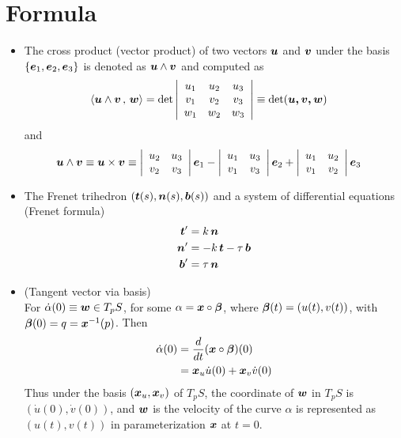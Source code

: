 \documentclass[11pt]{article}
\begin{document}
\section{Formula}
\begin{itemize}
\item The cross product (vector product) of two vectors $\boldsymbol{u}$ and $\boldsymbol{v}$ under the basis $\left\{\boldsymbol{e}_{1}, \boldsymbol{e}_{2}, \boldsymbol{e}_{3}\right\}$ is denoted as $\boldsymbol{u}\wedge \boldsymbol{v}$ and computed as
\begin{align}
\left\langle \boldsymbol{u}\wedge \boldsymbol{v}\,,\, \boldsymbol{w} \right\rangle &= \det\left\lvert \begin{array}{ccc}
u_{1} & u_{2} & u_{3} \\ 
v_{1} & v_{2} & v_{3} \\ 
w_{1} & w_{2} & w_{3}
\end{array}  \right\rvert  \equiv \det(\boldsymbol{u, v, w})\label{eqn: cross_prod}
\end{align}
and
\begin{align}
\boldsymbol{u}\wedge \boldsymbol{v} \equiv \boldsymbol{u} \times \boldsymbol{v} &\equiv \left\lvert \begin{array}{cc}
u_{2} & u_{3} \\ 
v_{2} & v_{3}
\end{array}  \right\rvert\boldsymbol{e}_{1}
- 
\left\lvert \begin{array}{cc}
u_{1} & u_{3} \\ 
v_{1} & v_{3}
\end{array}  \right\rvert\boldsymbol{e}_{2}
+
\left\lvert \begin{array}{cc}
u_{1} & u_{2} \\ 
v_{1} & v_{2}
\end{array}  \right\rvert\boldsymbol{e}_{3}  \label{eqn: cross_prod2}
\end{align}

\item The Frenet trihedron $(\boldsymbol{t}(s), \boldsymbol{n}(s), \boldsymbol{b}(s))$ and a system of differential equations (Frenet formula)
\begin{align}
\boldsymbol{t}' &= k\,\boldsymbol{n}\nonumber\\
\boldsymbol{n}' &= -k\,\boldsymbol{t} - \tau\,\boldsymbol{b}\nonumber\\
\boldsymbol{b}' &= \tau\,\boldsymbol{n} \label{eqn: Frenet_formula}
\end{align}

\item (Tangent vector via basis)\\
 For $\dot{\alpha}(0)\equiv \boldsymbol{w} \in T_{p}S$, for some $\alpha = \boldsymbol{x}\circ \boldsymbol{\beta}$, where  $\boldsymbol{\beta}(t) = (u(t), v(t))$, with $\boldsymbol{\beta}(0) = q = \boldsymbol{x}^{-1}(p)$. Then 
\begin{align}
\dot{\alpha}(0)&= \frac{d}{dt}(\boldsymbol{x}\circ\boldsymbol{\beta})(0)\\
&=\boldsymbol{x}_{u}\dot{u}(0) + \boldsymbol{x}_{v}\dot{v}(0) \label{eqn: tangent_line_coord}
\end{align} 
Thus under the basis $(\boldsymbol{x}_{u}, \boldsymbol{x}_{v})$ of $T_{p}S$, the coordinate of $\boldsymbol{w}$ in $T_{p}S$ is $(\dot{u}(0), \dot{v}(0))$, and $\boldsymbol{w}$ is the velocity of  the curve $\alpha$ is represented as $(u(t), v(t))$ in parameterization $\boldsymbol{x}$ at $t=0$. 


\end{itemize}
\end{document}
